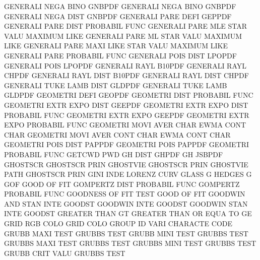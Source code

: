 GENERALI NEGA BINO                      GNBPDF
GENERALI NEGA BINO                      GNBPDF
GENERALI NEGA DIST                      GNBPDF
GENERALI PARE DEFI                      GEPPDF
GENERALI PARE DIST                      PROBABIL FUNC
GENERALI PARE MLE  STAR VALU            MAXIMUM  LIKE
GENERALI PARE ML   STAR VALU            MAXIMUM  LIKE
GENERALI PARE MAXI LIKE STAR VALU       MAXIMUM  LIKE
GENERALI PARE                           PROBABIL FUNC
GENERALI POIS DIST                      LPOPDF
GENERALI POIS                           LPOPDF
GENERALI RAYL                           B10PDF
GENERALI RAYL                           CHPDF
GENERALI RAYL DIST                      B10PDF
GENERALI RAYL DIST                      CHPDF
GENERALI TUKE LAMB DIST                 GLDPDF
GENERALI TUKE LAMB                      GLDPDF
GEOMETRI DEFI                           GEOPDF
GEOMETRI DIST                           PROBABIL FUNC
GEOMETRI EXTR EXPO DIST                 GEEPDF
GEOMETRI EXTR EXPO DIST                 PROBABIL FUNC
GEOMETRI EXTR EXPO                      GEEPDF
GEOMETRI EXTR EXPO                      PROBABIL FUNC
GEOMETRI MOVI AVER CHAR                 EWMA     CONT CHAR
GEOMETRI MOVI AVER CONT CHAR            EWMA     CONT CHAR
GEOMETRI POIS DIST                      PAPPDF
GEOMETRI POIS                           PAPPDF
GEOMETRI                                PROBABIL FUNC
GETCWD                                  PWD
GH       DIST                           GHPDF
GH                                      JSBPDF
GHOSTSCR                                GHOSTSCR PRIN
GHOSTVIE                                GHOSTSCR PRIN
GHOSTVIE PATH                           GHOSTSCR PRIN
GINI     INDE                           LORENZ   CURV
GLASS    G                              HEDGES   G
GOF                                     GOOD     OF   FIT
GOMPERTZ DIST                           PROBABIL FUNC
GOMPERTZ                                PROBABIL FUNC
GOODNESS OF   FIT  TEST                 GOOD     OF   FIT
GOODWIN  AND  STAN INTE                 GOODST
GOODWIN  INTE                           GOODST
GOODWIN  STAN INTE                      GOODST
GREATER  THAN                           GT
GREATER  THAN OR   EQUA TO              GE
GRID     RGB  COLO                      GRID     COLO
GROUP    ID   VARI                      CHARACTE CODE
GRUBB    MAXI TEST                      GRUBBS   TEST
GRUBB    MINI TEST                      GRUBBS   TEST
GRUBBS   MAXI TEST                      GRUBBS   TEST
GRUBBS   MINI TEST                      GRUBBS   TEST
GRUBB    CRIT VALU                      GRUBBS   TEST
